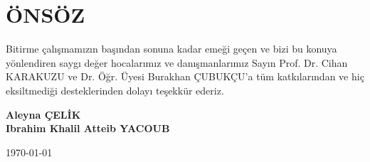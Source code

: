 \section*{ÖNSÖZ}
Bitirme çalışmamızın başından sonuna kadar emeği geçen ve bizi bu konuya yönlendiren saygı değer hocalarımız ve danışmanlarımız Sayın Prof. Dr. Cihan KARAKUZU ve Dr. Öğr. Üyesi Burakhan ÇUBUKÇU'a tüm katkılarından ve hiç eksiltmediği desteklerinden dolayı teşekkür ederiz.

\begin{flushright}
\textbf{Aleyna ÇELİK \\ Ibrahim Khalil Atteib YACOUB}

\today
\end{flushright}